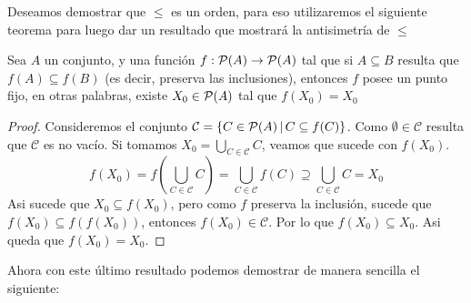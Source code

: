 \documentclass[12pt,a4paper]{book}
\begin{document}
Deseamos demostrar que $\leq$ es un orden, para eso utilizaremos el siguiente teorema para luego dar un resultado que mostrará la antisimetría de $\leq$
\begin{teo}
Sea $A$ un conjunto, y una función $f : \P(A) \rightarrow \P(A)$ tal que si $A \subseteq B$ resulta que $f(A) \subseteq f(B)$ (es decir, preserva las inclusiones), entonces $f$ posee un punto fijo, en otras palabras, existe $X_0 \in \P(A)$ tal que $f(X_0)=X_0$
\begin{proof}
Consideremos el conjunto $ \mathcal{C} = \{  C \in \P(A) \,\vert\, C \subseteq f(C) \}$. Como $ \emptyset \in \mathcal{C}$ resulta que $\mathcal{C}$ es no vacío. Si tomamos $X_0 = \bigcup_{C \in \mathcal{C}} C$, veamos que sucede con $f(X_0)$.
$$ f(X_0) = f\left( \bigcup_{C \in \mathcal{C}} C \right) = \bigcup_{C \in \mathcal{C}} f(C) \supseteq \bigcup_{C \in \mathcal{C}} C = X_0$$
Asi sucede que $X_0 \subseteq f(X_0)$, pero como $f$ preserva la inclusión, sucede que $f(X_0) \subseteq f(f(X_0))$, entonces $f(X_0) \in \mathcal{C}$. Por lo que $f(X_0) \subseteq X_0$. Asi queda que $f(X_0) = X_0$.
\end{proof}
\end{teo} 
Ahora con este último resultado podemos demostrar de manera sencilla el siguiente:
\end{document}
